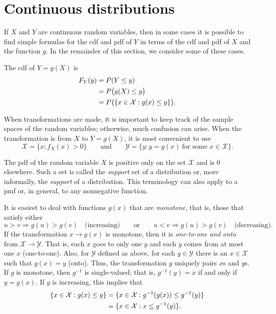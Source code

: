 \documentclass{article}
\theoremstyle{plain}
\theoremstyle{definition}
\begin{document}
\section{Continuous distributions}


If $X$ and $Y$ are continuous random variables, then in some cases it is possible to
find simple formulas for the cdf and pdf of $Y$ in terms of the cdf and pdf of $X$ and
the function $g$. In the remainder of this section, we consider some of these cases.

The cdf of $Y=g(X)$ is
\begin{align}
F_Y(y)
&= P(Y\le y) \notag\\
&= P\bigl(g(X)\le y\bigr) \notag\\
&= P\bigl(\{x\in \mathcal{X}: g(x)\le y\}\bigr).
\end{align}

When transformations are made, it is important to keep track of the sample spaces
of the random variables; otherwise, much confusion can arise. When the transformation
is from $X$ to $Y=g(X)$, it is most convenient to use
\begin{equation*}
\mathcal{X}=\{x: f_X(x)>0\}
\qquad \text{and} \qquad
\mathcal{Y}=\{y: y=g(x)\ \text{for some } x\in\mathcal{X}\}.
\end{equation*}

The pdf of the random variable $X$ is positive only on the set $\mathcal{X}$ and is
0 elsewhere. Such a set is called the \emph{support} set of a distribution or, more
informally, the \emph{support} of a distribution. This terminology can also apply to
a pmf or, in general, to any nonnegative function.

It is easiest to deal with functions $g(x)$ that are \emph{monotone}, that is, those
that satisfy either
\[
u>v \Rightarrow g(u)>g(v)\quad \text{(increasing)}
\qquad \text{or} \qquad
u<v \Rightarrow g(u)>g(v)\quad \text{(decreasing)}.
\]
If the transformation $x\to g(x)$ is monotone, then it is \emph{one-to-one and onto}
from $\mathcal{X}\to\mathcal{Y}$. That is, each $x$ goes to only one $y$ and each $y$
comes from at most one $x$ (one-to-one). Also, for $\mathcal{Y}$ defined as above,
for each $y\in\mathcal{Y}$ there is an $x\in\mathcal{X}$ such that $g(x)=y$ (onto).
Thus, the transformation $g$ uniquely pairs $x$s and $y$s. If $g$ is monotone, then
$g^{-1}$ is single-valued; that is, $g^{-1}(y)=x$ if and only if $y=g(x)$. If $g$ is
increasing, this implies that
\begin{align*}
\{x\in\mathcal{X}: g(x)\le y\}
&= \{x\in\mathcal{X}: g^{-1}(g(x))\le g^{-1}(y)\} \notag\\
&= \{x\in\mathcal{X}: x\le g^{-1}(y)\}.
\end{align*}
\end{document}

